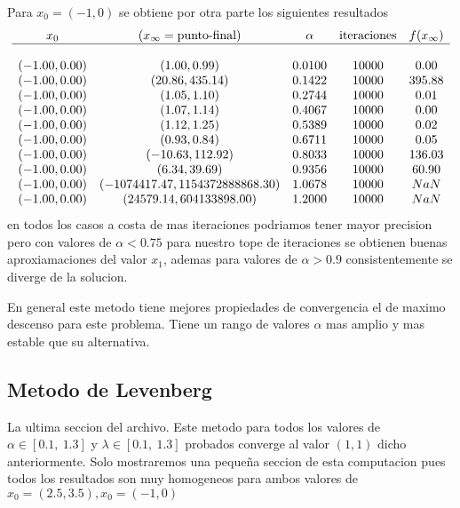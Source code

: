\documentclass[letterpaper]{article}
\begin{document}
Para \(x_0 = (-1,0)\) se obtiene por otra parte los siguientes resultados
\[
\begin{array}{c c c c c}
  x_0 & (x_{\infty} = \text{punto-final}) & \alpha & \text{iteraciones} &
    f(x_{\infty}) \\
  \hline \\
(-1.00, 0.00) & (1.00, 0.99)                    & 0.0100 & 10000 & 0.00   \\
(-1.00, 0.00) & (20.86, 435.14)                 & 0.1422 & 10000 & 395.88 \\
(-1.00, 0.00) & (1.05, 1.10)                    & 0.2744 & 10000 & 0.01   \\
(-1.00, 0.00) & (1.07, 1.14)                    & 0.4067 & 10000 & 0.00   \\
(-1.00, 0.00) & (1.12, 1.25)                    & 0.5389 & 10000 & 0.02   \\
(-1.00, 0.00) & (0.93, 0.84)                    & 0.6711 & 10000 & 0.05   \\
(-1.00, 0.00) & (-10.63, 112.92)                & 0.8033 & 10000 & 136.03 \\
(-1.00, 0.00) & (6.34, 39.69)                   & 0.9356 & 10000 & 60.90  \\
(-1.00, 0.00) & (-1074417.47, 1154372888868.30) & 1.0678 & 10000 & NaN \\
(-1.00, 0.00) & (24579.14, 604133898.00)        & 1.2000 & 10000 & NaN
\end{array}
\]
en todos los casos a costa de mas iteraciones podriamos tener mayor
precision pero con valores de \(\alpha < 0.75\) para nuestro tope de
iteraciones se obtienen buenas aproxiamaciones del valor \(x_1\), ademas
para valores de \(\alpha > 0.9\) consistentemente se diverge de la solucion.

En general este metodo tiene mejores propiedades de convergencia el de
maximo descenso para este problema. Tiene un rango de valores \(\alpha\)
mas amplio y mas estable que su alternativa.

\subsection*{Metodo de Levenberg}
La ultima seccion del archivo. Este metodo para todos los valores de
\(\alpha \in [0.1,\ 1.3]\) y \(\lambda \in [0.1,\ 1.3]\) probados
converge al valor \((1,1)\) dicho anteriormente. Solo mostraremos una
pequeña seccion de esta computacion pues todos los resultados son muy
homogeneos para ambos valores de \(x_0 = (2.5, 3.5), x_0 = (-1,0)\)
\end{document}
